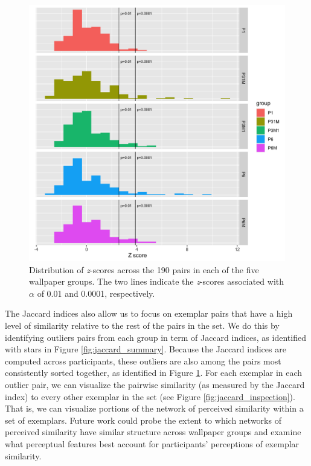 \documentclass[11pt, twoside]{article}
\begin{document}
\begin{figure}[H]
	\centering
	\includegraphics[width=.85\linewidth]{./figures/jaccard_permutation.png}
	\caption{Distribution of \textit{z}-scores across the 190 pairs in each of the five wallpaper groups. The two lines indicate the \textit{z}-scores associated with $\alpha$ of 0.01 and 0.0001, respectively.}
	\label{fig:jaccard_permutation}
\end{figure}

The Jaccard indices also allow us to focus on exemplar pairs that have a high level of similarity relative to the rest of the pairs in the set. We do this by identifying outliers pairs from each group in term of Jaccard indices, as identified with stars in Figure \ref{fig:jaccard_summary}. Because the Jaccard indices are computed across participants, these outliers are also among the pairs most consistently sorted together, as identified in Figure \ref{fig:jaccard_permutation}. For each exemplar in each outlier pair, we can visualize the pairwise similarity (as measured by the Jaccard index) to every other exemplar in the set (see Figure \ref{fig:jaccard_inspection}). That is, we can visualize portions of the network of perceived similarity within a set of exemplars. Future work could probe the extent to which networks of perceived similarity have similar structure across wallpaper groups and examine what perceptual features best account for participants' perceptions of exemplar similarity.
\end{document}
